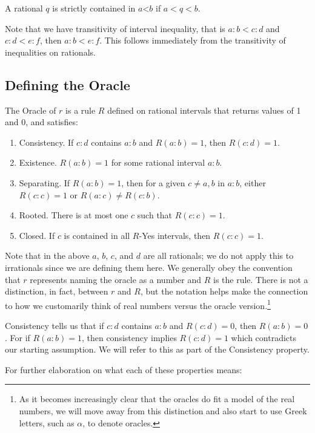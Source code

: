 \documentclass[12pt]{article}
\theoremstyle{remark}
\newcommand{\lt}{\mathord{<}}
\begin{document}
A rational $q$ is strictly contained in $a\lt b$ if $a < q < b$. 

Note that we have transitivity of interval inequality, that is $a:b < c:d$ and $c:d < e:f$, then $a:b < e:f$. This follows immediately from the transitivity of inequalities on rationals.

\subsection{Defining the Oracle}

The Oracle of $r$ is a rule $R$ defined on rational intervals that returns values of 1 and 0, and satisfies: 
\begin{enumerate}
    \item Consistency. If $c:d$ contains $a:b$ and $R(a:b) = 1$, then $R(c:d) = 1$.
    \item Existence. $R(a:b) = 1$ for some rational interval $a:b$.
    \item Separating. If $R(a:b)=1$, then for a given $c \neq a, b$ in $a:b$, either $R(c:c) = 1$ or $R(a:c) \neq R(c:b)$. 
    \item Rooted. There is at most one $c$ such that $R(c:c) =1$.
    \item Closed. If $c$ is contained in all $R$-Yes intervals, then $R(c:c) = 1$.
\end{enumerate}

Note that in the above $a$, $b$, $c$, and $d$ are all rationals; we do not apply this to irrationals since we are defining them here. We generally obey the convention that $r$ represents naming the oracle as a number and $R$ is the rule. There is not a distinction, in fact, between $r$ and $R$, but the notation helps make the connection to how we customarily think of real numbers versus the oracle version.\footnote{As it becomes increasingly clear that the oracles do fit a model of the real numbers, we will move away from this distinction and also start to use Greek letters, such as $\alpha$, to denote oracles.}

Consistency tells us that if $c:d$ contains $a:b$ and $R(c:d) = 0$, then $R(a:b) = 0$. For if $R(a:b)=1$, then consistency implies $R(c:d)=1$ which contradicts our starting assumption. We will refer to this as part of the Consistency property. 

For further elaboration on what each of these properties means:
\end{document}
